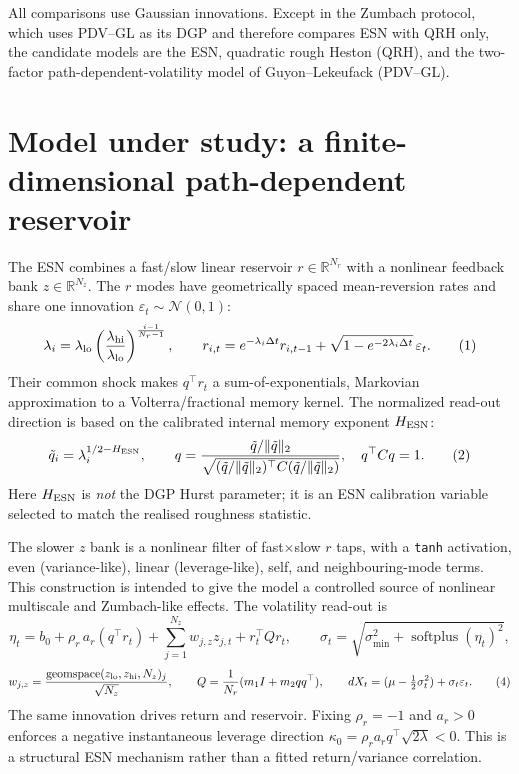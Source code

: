 \documentclass[10pt,a4paper]{article}
\begin{document}
All comparisons use Gaussian innovations.  Except in the Zumbach protocol, which uses PDV--GL as its DGP and therefore compares ESN with QRH only, the candidate models are the ESN, quadratic rough Heston (QRH), and the two-factor path-dependent-volatility model of Guyon--Lekeufack (PDV--GL).

\section{Model under study: a finite-dimensional path-dependent reservoir}
The ESN combines a fast/slow linear reservoir $r\in\mathbb R^{N_r}$ with a nonlinear feedback bank $z\in\mathbb R^{N_z}$.  The $r$ modes have geometrically spaced mean-reversion rates and share one innovation $\varepsilon_t\sim\mathcal N(0,1)$:
\begin{equation}
 \lambda_i=\lambda_{\rm lo}\left(\frac{\lambda_{\rm hi}}{\lambda_{\rm lo}}\right)^{\frac{i-1}{N_r-1}},\qquad
 r_{i,t}=e^{-\lambda_i\Delta t}r_{i,t-1}+\sqrt{1-e^{-2\lambda_i\Delta t}}\,\varepsilon_t. \tag{1}
\end{equation}
Their common shock makes $q^\top r_t$ a sum-of-exponentials, Markovian approximation to a Volterra/fractional memory kernel.  The normalized read-out direction is based on the calibrated internal memory exponent $H_{\rm ESN}$:
\begin{equation}
 \tilde q_i=\lambda_i^{1/2-H_{\rm ESN}},\qquad
 q=\frac{\tilde q/\|\tilde q\|_2}{\sqrt{(\tilde q/\|\tilde q\|_2)^\top C(\tilde q/\|\tilde q\|_2)}},\quad q^\top Cq=1. \tag{2}
\end{equation}
Here $H_{\rm ESN}$ is \emph{not} the DGP Hurst parameter; it is an ESN calibration variable selected to match the realised roughness statistic.

The slower $z$ bank is a nonlinear filter of fast$\times$slow $r$ taps, with a \texttt{tanh} activation, even (variance-like), linear (leverage-like), self, and neighbouring-mode terms.  This construction is intended to give the model a controlled source of nonlinear multiscale and Zumbach-like effects.  The volatility read-out is
\begin{equation}
 \eta_t=b_0+\rho_r\,a_r(q^\top r_t)+\sum_{j=1}^{N_z}w_{j,z}z_{j,t}+r_t^\top Qr_t,\qquad
 \sigma_t=\sqrt{\sigma_{\min}^2+\operatorname{softplus}(\eta_t)^2}, \tag{3}
\end{equation}
\begin{equation}
 w_{j,z}=\frac{\operatorname{geomspace}(z_{\rm lo},z_{\rm hi},N_z)_j}{\sqrt{N_z}},\qquad
 Q=\frac{1}{N_r}(m_1I+m_2qq^\top),\qquad
 dX_t=(\mu-\tfrac12\sigma_t^2)+\sigma_t\varepsilon_t. \tag{4}
\end{equation}
The same innovation drives return and reservoir.  Fixing $\rho_r=-1$ and $a_r>0$ enforces a negative instantaneous leverage direction $\kappa_0=\rho_ra_rq^\top\sqrt{2\lambda}<0$.  This is a structural ESN mechanism rather than a fitted return/variance correlation.
\end{document}
